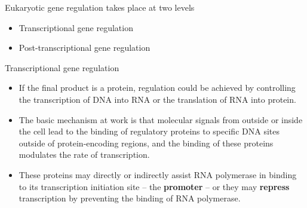 \documentclass[11pt,dvipsnames,ignorenonframetext,aspectratio=169]{beamer}
\providecommand{\tightlist}{%
  \setlength{\itemsep}{0pt}\setlength{\parskip}{0pt}}
\begin{document}
\begin{frame}{Eukaryotic gene regulation takes place at two levels}
\protect\hypertarget{eukaryotic-gene-regulation-takes-place-at-two-levels}{}

\begin{itemize}
\tightlist
\item
  Transcriptional gene regulation
\item
  Post-transcriptional gene regulation
\end{itemize}

\end{frame}

\begin{frame}{Transcriptional gene regulation}
\protect\hypertarget{transcriptional-gene-regulation}{}

\begin{itemize}
\tightlist
\item
  If the final product is a protein, regulation could be achieved by
  controlling the transcription of DNA into RNA or the translation of
  RNA into protein.
\item
  The basic mechanism at work is that molecular signals from outside or
  inside the cell lead to the binding of regulatory proteins to specific
  DNA sites outside of protein-encoding regions, and the binding of
  these proteins modulates the rate of transcription.
\item
  These proteins may directly or indirectly assist RNA polymerase in
  binding to its transcription initiation site -- the \textbf{promoter}
  -- or they may \textbf{repress} transcription by preventing the
  binding of RNA polymerase.
\end{itemize}

\end{frame}
\end{document}
